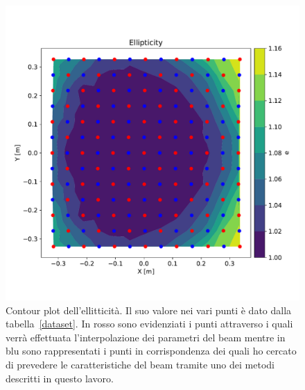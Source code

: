 \documentclass[12pt,a4paper,final]{book}
\begin{document}
\begin{figure}[!ht]
	\centering
	\includegraphics[scale=0.6]{../figures/ContourPlot_e.pdf}
	\caption{Contour plot dell'ellitticità. Il suo valore nei vari punti è dato dalla tabella~\ref{dataset}. In rosso sono evidenziati i punti attraverso i quali verrà effettuata l'interpolazione dei parametri del beam mentre in blu sono rappresentati i punti in corrispondenza dei quali ho cercato di prevedere le caratteristiche del beam tramite uno dei metodi descritti in questo lavoro.}
	\label{cplot_e}
\end{figure}

\end{document}
